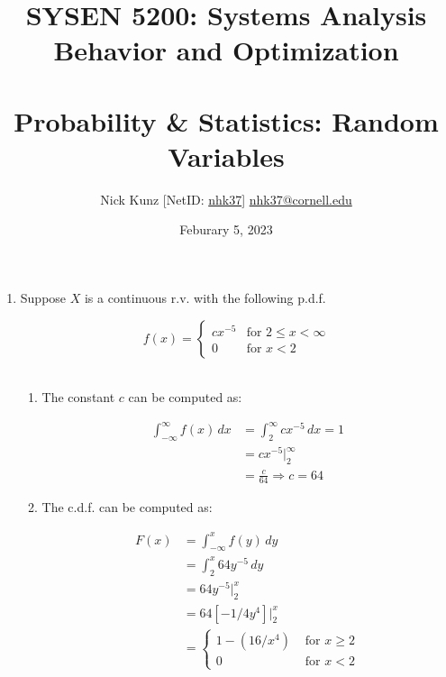 \documentclass{article}
\begin{document}
\title{SYSEN 5200: Systems Analysis Behavior and Optimization\\~\\
    \Large Probability \& Statistics: Random Variables
}
\author{
    Nick Kunz [NetID: \url{nhk37}] \hyperlink{nhk37@cornell.edu}{nhk37@cornell.edu}}
\date{Feburary 5, 2023}
\maketitle
\thispagestyle{fancy}

\begin{enumerate}

    \item Suppose $X$ is a continuous r.v. with the following p.d.f.
    
    \begin{equation}\nonumber
    f(x) = \begin{cases}
        cx^{-5} & \text{for } 2 \leq x < \infty\\
        0 & \text{for } x < 2
        \end{cases}
    \end{equation}\\

    \begin{enumerate}
        \item The constant $c$ can be computed as:
        
        \begin{equation}
            \begin{split}
                \int_{-\infty}^{\infty} f(x) \,dx &= \int_{2}^{\infty} cx^{-5} \,dx = 1\\
                &= cx^{-5} \bigg|_{2}^{\infty}\\
                &= \frac{c}{64} \Rightarrow c = 64
            \end{split}
        \end{equation}
        
        \item The c.d.f. can be computed as:
        
        \begin{equation}
            \begin{split}
                F(x) &= \int_{-\infty}^{x} f(y) \,dy\\
                &= \int_{2}^{x} 64y^{-5} \,dy\\
                &= 64y^{-5} \bigg|_{2}^{x}\\
                &= 64[-1/4y^{4}] \bigg|_{2}^{x}\\
                &= \begin{cases}
                    1 - (16/x^4) & \text{ for } x \geq 2\\
                    0 & \text{ for } x < 2
                \end{cases}
            \end{split}
        \end{equation}


\end{enumerate}
\end{enumerate}
\end{document}
